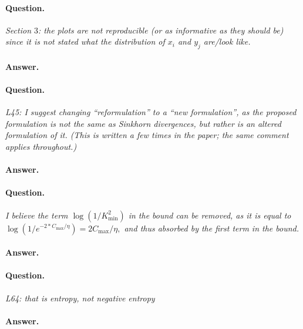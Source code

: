 \documentclass[11pt]{article}
\begin{document}
\paragraph{Question.}

\emph{Section $3$: the plots are not reproducible (or as informative as they should be) since it is not stated what the distribution of $x_i$ and $y_j$ are/look like.}

\paragraph{Answer.} 


\paragraph{Question.}

\emph{L45: I suggest changing “reformulation” to a “new formulation”, as the proposed formulation is not the same as Sinkhorn divergences, but rather is an altered formulation of it. (This is written a few times in the paper; the same comment applies throughout.)}

\paragraph{Answer.} 


\paragraph{Question.}

\emph{I believe the term $\log(1/K_{\min}^2)$ in the bound can be removed, as it is equal to $\log(1/e^{-2*C_{\max}/\eta}) = 2 C_{\max} /\eta,$ and thus absorbed by the first term in the bound.}

\paragraph{Answer.} 


\paragraph{Question.}

\emph{L64: that is entropy, not negative entropy}

\paragraph{Answer.} 
\end{document}
